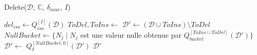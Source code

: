 \begin{procedure}[ht]
    \caption{Delete($\mathcal{D}$, $\mathbb{C}$, $\delta_{max}$, $I$)}
    \label{algo:update:delete}

    $del_{iso} \gets Q_{iso}^{[I]}(\mathcal{D})$ \label{algo:update:delete:iso} \;
    $ToDel, ToIns \gets$  \label{algo:update:delete:chase} \;
    $\mathcal{D}' \gets (\mathcal{D} \cup ToIns) \setminus ToDel$ \label{algo:update:delete:buildInstance} \;
    $NullBucket \gets \{N_j \mid N_j$ est une valeur nulle obtenue par $Q_{bucket}^{[ToIns \cup ToDel]}(\mathcal{D}')\}$ \label{algo:update:delete:bucket} \;
    $\mathcal{D}' \gets$  \label{algo:update:delete:core} \;
    $Q_{\delta}^{[NullBucket,0]}(\mathcal{D}')$ \label{algo:update:delete:setDegree} \;
    \Return $\mathcal{D}'$
\end{procedure}

